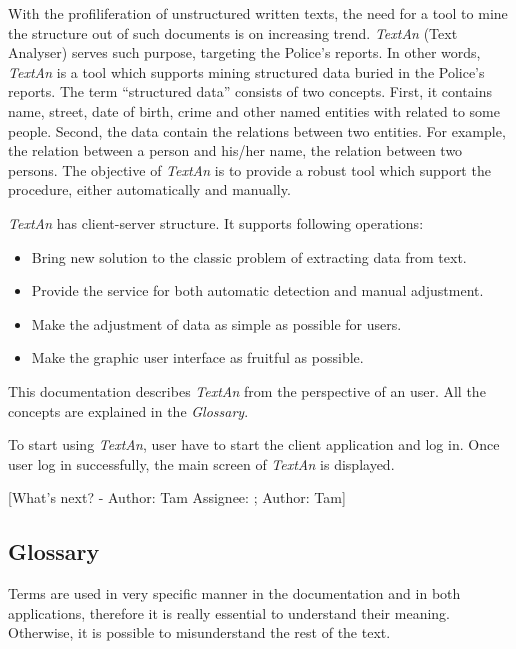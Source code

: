 \documentclass[12pt,a4paper]{report}
\makeatletter
\newcommand{\comment}[3][\@empty]{
  {\color{magenta}[#3 - }
  {\color{green}\ifx\@empty#1\relax Author: #2 \else Assignee: #1; Author: #2\fi}{\color{magenta}]}
}
\newcommand{\textan}{\emph{TextAn}}
\makeatother
\begin{document}
With the profiliferation of unstructured written texts, the need for a tool to mine the structure out of such documents is on increasing trend. 
\textan{} (Text Analyser) serves such purpose, targeting the Police's reports. 
In other words, \textan{} is a tool which supports mining structured data buried in the Police's reports. The term ``structured data'' consists of two concepts. 
First, it contains name, street, date of birth, crime and other named entities with related to some people. 
Second, the data contain the relations between two entities. 
For example, the relation between a person and his/her name, the relation between two persons. The objective of \textan{} is to provide a robust tool which support the procedure, either automatically and manually.

\textan{} has client-server structure. It supports following operations:
  
  \begin{itemize}
  \item Bring new solution to the classic problem of extracting data from text.
  \item Provide the service for both automatic detection and manual adjustment.
  \item Make the adjustment of data as simple as possible for users.
  \item Make the graphic user interface as fruitful as possible.
  \end{itemize}

This documentation describes \textan{} from the perspective of an user. 
All the concepts are explained in the \emph{Glossary}.

To start using \textan{}, user have to start the client application and log in. 
Once user log in successfully, the main screen of \textan{} is displayed.

\comment{Tam}{What's next?} 

\subsection{Glossary}
Terms are used in very specific manner in the documentation and in both applications,
therefore it is really essential to understand their meaning. Otherwise, it is
possible to misunderstand the rest of the text.
\end{document}
